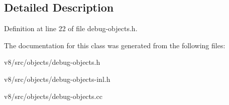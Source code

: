 \subsection{Detailed Description}


Definition at line 22 of file debug-\/objects.\+h.



The documentation for this class was generated from the following files\+:\begin{DoxyCompactItemize}
\item 
v8/src/objects/debug-\/objects.\+h\item 
v8/src/objects/debug-\/objects-\/inl.\+h\item 
v8/src/objects/debug-\/objects.\+cc\end{DoxyCompactItemize}
